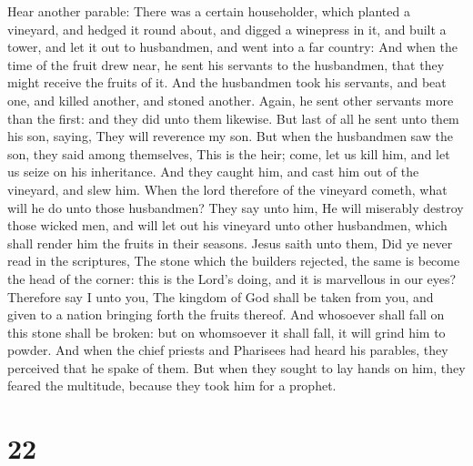  Hear another parable: There was a certain householder,
which planted a vineyard, and hedged it round about, and digged a
winepress in it, and built a tower, and let it out to husbandmen, and
went into a far country:  And when the time of the fruit
drew near, he sent his servants to the husbandmen, that they might
receive the fruits of it.  And the husbandmen took his
servants, and beat one, and killed another, and stoned another.
 Again, he sent other servants more than the first: and
they did unto them likewise.  But last of all he sent unto
them his son, saying, They will reverence my son.  But when
the husbandmen saw the son, they said among themselves, This is the
heir; come, let us kill him, and let us seize on his inheritance.
 And they caught him, and cast him out of the vineyard, and
slew him.  When the lord therefore of the vineyard cometh,
what will he do unto those husbandmen?  They say unto him,
He will miserably destroy those wicked men, and will let out his
vineyard unto other husbandmen, which shall render him the fruits in
their seasons.  Jesus saith unto them, Did ye never read in
the scriptures, The stone which the builders rejected, the same is
become the head of the corner: this is the Lord's doing, and it is
marvellous in our eyes?  Therefore say I unto you, The
kingdom of God shall be taken from you, and given to a nation bringing
forth the fruits thereof.  And whosoever shall fall on this
stone shall be broken: but on whomsoever it shall fall, it will grind
him to powder.  And when the chief priests and Pharisees
had heard his parables, they perceived that he spake of them.
 But when they sought to lay hands on him, they feared the
multitude, because they took him for a prophet.

\hypertarget{section-21}{%
\section{22}\label{section-21}}


